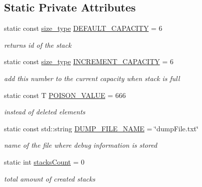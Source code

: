 \subsection*{Static Private Attributes}
\begin{DoxyCompactItemize}
\item 
static const \hyperlink{class_my_namespace_1_1_stack_a19c43f92e11d91ed645058833af88a86}{size\+\_\+type} \hyperlink{class_my_namespace_1_1_stack_a4b75778037e106878d008d6a859dad27}{D\+E\+F\+A\+U\+L\+T\+\_\+\+C\+A\+P\+A\+C\+I\+TY} = 6
\begin{DoxyCompactList}\small\item\em returns id of the stack \end{DoxyCompactList}\item 
\mbox{\label{class_my_namespace_1_1_stack_a039dc0693f4106e0423744858208bb43}} 
static const \hyperlink{class_my_namespace_1_1_stack_a19c43f92e11d91ed645058833af88a86}{size\+\_\+type} \hyperlink{class_my_namespace_1_1_stack_a039dc0693f4106e0423744858208bb43}{I\+N\+C\+R\+E\+M\+E\+N\+T\+\_\+\+C\+A\+P\+A\+C\+I\+TY} = 6
\begin{DoxyCompactList}\small\item\em add this number to the current capacity when stack is full \end{DoxyCompactList}\item 
\mbox{\label{class_my_namespace_1_1_stack_a73353c295ad205ab3fb937019c04c73e}} 
static const T \hyperlink{class_my_namespace_1_1_stack_a73353c295ad205ab3fb937019c04c73e}{P\+O\+I\+S\+O\+N\+\_\+\+V\+A\+L\+UE} = 666
\begin{DoxyCompactList}\small\item\em instead of deleted elements \end{DoxyCompactList}\item 
\mbox{\label{class_my_namespace_1_1_stack_a26220dbae7ab40c96d231de833d7fd3a}} 
static const std\+::string \hyperlink{class_my_namespace_1_1_stack_a26220dbae7ab40c96d231de833d7fd3a}{D\+U\+M\+P\+\_\+\+F\+I\+L\+E\+\_\+\+N\+A\+ME} = \char`\"{}dump\+File.\+txt\char`\"{}
\begin{DoxyCompactList}\small\item\em name of the file where debug information is stored \end{DoxyCompactList}\item 
\mbox{\label{class_my_namespace_1_1_stack_aacf506519cc4918a07467e89a0f07f2f}} 
static int \hyperlink{class_my_namespace_1_1_stack_aacf506519cc4918a07467e89a0f07f2f}{stacks\+Count} = 0
\begin{DoxyCompactList}\small\item\em total amount of created stacks \end{DoxyCompactList}\end{DoxyCompactItemize}


